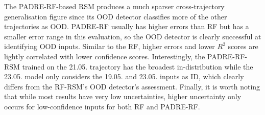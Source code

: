 The PADRE-RF-based RSM produces a much sparser cross-trajectory generalisation figure since its OOD detector classifies more of the other trajectories as OOD. PADRE-RF usually has higher errors than RF but has a smaller error range in this evaluation, so the OOD detector is clearly successful at identifying OOD inputs. Similar to the RF, higher errors and lower $R^2$ scores are lightly correlated with lower confidence scores. Interestingly, the PADRE-RF-RSM trained on the 21.05. trajectory has the broadest in-distribution while the 23.05. model only considers the 19.05. and 23.05. inputs as ID, which clearly differs from the RF-RSM's OOD detector's assessment. Finally, it is worth noting that while most results have very low uncertainties, higher uncertainty only occurs for low-confidence inputs for both RF and PADRE-RF.

